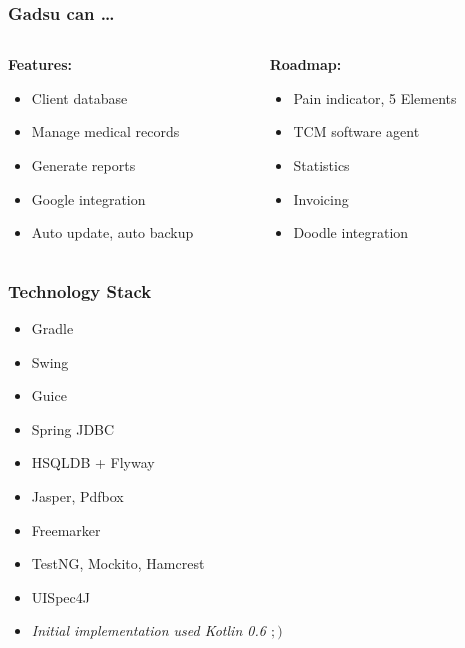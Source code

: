 \begin{frame}[t]
\frametitle{Gadsu can \ldots}
\begin{columns}[t]
\begin{column}{0.5\textwidth}
	\textbf{Features:}
	\begin{itemize}
		\item Client database
		\item Manage medical records
		\item Generate reports
		\item Google integration
		\item Auto update, auto backup
	\end{itemize}
\end{column}
\begin{column}{0.5\textwidth} 
	\textbf{Roadmap:}
	\begin{itemize}
		\item Pain indicator, 5 Elements
		\item TCM software agent
		\item Statistics
		\item Invoicing
		\item Doodle integration
	\end{itemize}
\end{column}
\end{columns}
\end{frame}

\begin{frame}
\frametitle{Technology Stack}
\begin{itemize}
	\item Gradle
	\item Swing
	\item Guice
	\item Spring JDBC
	\item HSQLDB + Flyway
	\item Jasper, Pdfbox
	\item Freemarker
	\item TestNG, Mockito, Hamcrest
	\item UISpec4J
	\item \textit{Initial implementation used Kotlin 0.6 $;)$}
\end{itemize}
\end{frame}





